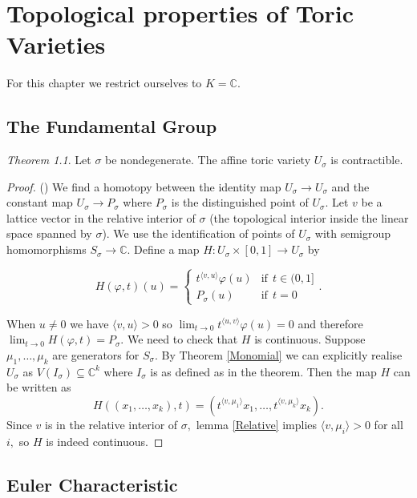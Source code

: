 \documentclass[BSc]{usydthesis}
\numberwithin{equation}{chapter}
\theoremstyle{remark}
\newtheorem{Theorem}[equation]{Theorem}
\newcommand{\C}{\mathbb{C}}
\begin{document}
\chapter{Topological properties of Toric Varieties}
For this chapter we restrict ourselves to $K=\C.$

\section{The Fundamental Group}

\begin{Theorem}
 Let $\sigma$ be nondegenerate. The affine toric variety $U_{\sigma}$ is contractible. 
\end{Theorem}

\begin{proof}
 (\cite[Page.~ 58]{Fulton:Toric}) We find a homotopy between the identity map $U_{\sigma}\to U_{\sigma}$ and the constant map $U_{\sigma} \to P_{\sigma}$ where $P_{\sigma}$ is the distinguished point of $U_{\sigma}.$ Let $v$ be a lattice vector in the relative interior of $\sigma$ (the topological interior inside the linear space spanned by $\sigma$). We use the identification of points of $U_{\sigma}$ with semigroup homomorphisms $S_{\sigma}\to \C.$ Define a map $H:U_{\sigma} \times [0,1] \to U_{\sigma}$ by 
 
 $$ H(\varphi, t)(u) = \begin{cases} 
      t^{ \langle v, u \rangle} \varphi(u) & \text{if} \ \  t\in (0,1] \\
      P_{\sigma}(u) & \text{if} \ \  t=0 
   \end{cases}.$$

When $u\neq 0$ we have $\langle v, u \rangle >0$ so $\lim_{t\to 0} t^{ \langle u, v \rangle} \varphi(u) =0$ and therefore $\lim_{t\to 0} H(\varphi, t) = P_{\sigma}.$ We need to check that $H$ is continuous. Suppose $\mu_1, \ldots, \mu_k$ are generators for $S_{\sigma}.$ By Theorem \ref{Monomial} we can explicitly realise $U_{\sigma}$ as $V(I_{\sigma})\subseteq \C^k$ where $I_{\sigma}$ is as defined as in the theorem. Then the map $H$ can be written as $$ H((x_1,\ldots, x_k) ,t) = ( t^{ \langle v, \mu_1 \rangle}x_1, \ldots, t^{ \langle v, \mu_k \rangle} x_k).$$ Since $v$ is in the relative interior of $\sigma,$ lemma \ref{Relative} implies $\langle v, \mu_i \rangle >0$ for all $i,$ so $H$ is indeed continuous. 
\end{proof}




\section{Euler Characteristic} 
\end{document}

